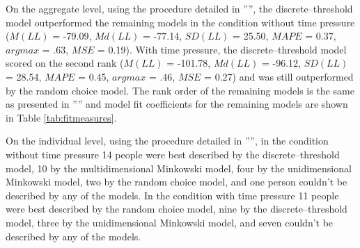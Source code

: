 \documentclass[a4paper,man,natbib]{apa6}
\begin{document}
On the aggregate level, using the procedure detailed in '''', the discrete--threshold model outperformed the remaining models in the condition without time pressure ($M(LL)$ = -79.09, $Md(LL)$ = -77.14, $SD(LL)$ = 25.50, $MAPE$ = 0.37, $argmax$ = .63, $MSE$ = 0.19).
With time pressure, the discrete--threshold model scored on the second rank ($M(LL)$ = -101.78, $Md(LL)$ = -96.12, $SD(LL)$ = 28.54, $MAPE$ = 0.45, $argmax$ = .46, $MSE$ = 0.27) and was still outperformed by the random choice model. The rank order of the remaining models is the same as presented in '''' and model fit coefficients for the remaining models are shown in Table \ref{tab:fitmeasures}. 

On the individual level, using the procedure detailed in '''', in the condition without time pressure 14 people were best described by the discrete--threshold model, 10 by the multidimensional Minkowski model, four by the unidimensional Minkowski model, two by the random choice model, and one person couldn't be described by any of the models. In the condition with time pressure 11 people were best described by the random choice model, nine by the discrete--threshold model, three by the unidimensional Minkowski model, and seven couldn't be described by any of the models.
\end{document}
